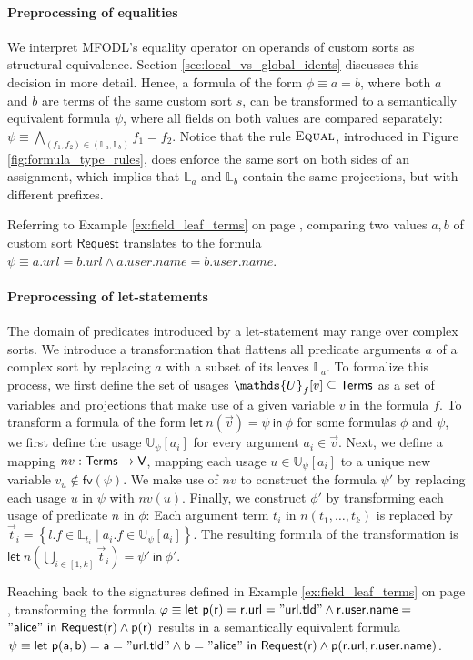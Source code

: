 \paragraph{Preprocessing of equalities}
We interpret MFODL's equality operator on operands of custom sorts as structural equivalence. Section \ref{sec:local_vs_global_idents} discusses this decision in more detail. Hence, a formula of the form $\phi \equiv a = b$, where both $a$ and $b$ are terms of the same custom sort $s$, can be transformed to a semantically equivalent formula $\psi$, where all fields on both values are compared separately: $\psi \equiv \bigwedge_{(f_1, f_2) \in (\mathds{L}_a, \mathds{L}_b)} f_1 = f_2$. Notice that the rule $\textsc{Equal}$, introduced in Figure \ref{fig:formula_type_rules}, does enforce the same sort on both sides of an assignment, which implies that $\mathds{L}_a$ and $\mathds{L}_b$ contain the same projections, but with different prefixes.

Referring to Example \ref{ex:field_leaf_terms} on page \pageref{ex:field_leaf_terms}, comparing two values $a, b$ of custom sort $\mathsf{Request}$ translates to the formula $\psi \equiv a.url = b.url \wedge a.user.name = b.user.name$.

\paragraph{Preprocessing of let-statements}
The domain of predicates introduced by a let-statement may range over complex sorts. We introduce a transformation that flattens all predicate arguments $a$ of a complex sort by replacing $a$ with a subset of its leaves $\mathds{L}_a$. To formalize this process, we first define the set of usages $\mathds{U}_f[v] \subseteq \mfodlTerms$ as a set of variables and projections that make use of a given variable $v$ in the formula $f$. To transform a formula of the form $\mathsf{let}\ n(\vec{v}) = \psi\ \mathsf{in}\ \phi$ for some formulas $\phi$ and $\psi$, we first define the usage $\mathds{U}_{\psi}[a_i]$ for every argument $a_i \in \vec{v}$. Next, we define a mapping $nv : \mfodlTerms \to \mfodlVars$, mapping each usage $u \in \mathds{U}_{\psi}[a_i]$ to a unique new variable $v_u \notin \mathsf{fv}(\psi)$. We make use of $nv$ to construct the formula $\psi'$ by replacing each usage $u$ in $\psi$ with $nv(u)$. Finally, we construct $\phi'$ by transforming each usage of predicate $n$ in $\phi$: Each argument term $t_i$ in $n(t_1, \dots, t_k)$ is replaced by $\vec{t}_i = \left\{l.f \in \mathds{L}_{t_i} \mid a_i.f \in \mathds{U}_{\psi}[a_i]\right\}$. The resulting formula of the transformation is $\mathsf{let}\ n\left( \bigcup_{i \in [1, k]} \vec{t}_i \right) = \psi'\ \mathsf{in}\ \phi'$.
\begin{example}
	Reaching back to the signatures defined in Example \ref{ex:field_leaf_terms} on page \pageref{ex:field_leaf_terms}, transforming the formula $\phi \equiv \mathsf{let\ p(r) = r.url = "url.tld" \land r.user.name =}$ \\ $\mathsf{"alice"\ in\ Request(r) \land p(r)}$ results in a semantically equivalent formula $\psi \equiv \mathsf{let\ p(a, b) = a = "url.tld" \land b = "alice"\ in\ Request(r) \land p(r.url, r.user.name)}$.
\end{example}


